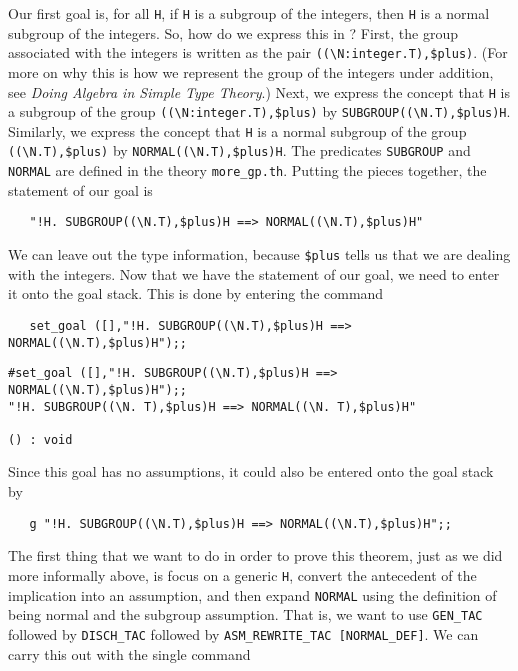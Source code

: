 Our first goal is, for all {\small\tt H}, if {\small\tt H} is a
subgroup of the integers, then {\small\tt H} is a normal subgroup of
the integers.  So, how do we express this in \HOL?  First, the group
associated with the integers is written as the pair
{\small\verb+((\N:integer.T),$plus)+}.  (For more on why this is
how we represent the group of the integers under addition, see
{\it Doing Algebra in Simple Type Theory}.)  Next, we express the
concept that {\small\tt H} is a subgroup of the group
{\small\verb+((\N:integer.T),$plus)+} by
{\small\verb+SUBGROUP((\N.T),$plus)H+}.
Similarly, we express the concept that {\small\tt H} is a normal
subgroup of the group {\small\verb+((\N.T),$plus)+} by
{\small\verb+NORMAL((\N.T),$plus)H+}.  The predicates
{\small\verb+SUBGROUP+} and {\small\verb+NORMAL+} are
defined in the theory {\small\verb+more_gp.th+}.  Putting the
pieces together, the statement of our goal is
\begin{verbatim}
   "!H. SUBGROUP((\N.T),$plus)H ==> NORMAL((\N.T),$plus)H"
\end{verbatim}
We can leave out the type information, because
{\small\verb+$plus+} tells us that we are dealing with the
integers.  Now that we have the statement of our goal, we need to
enter it onto the goal stack.  This is done by entering the command
\begin{verbatim}
   set_goal ([],"!H. SUBGROUP((\N.T),$plus)H ==> NORMAL((\N.T),$plus)H");;
\end{verbatim}
\begin{session}
\begin{verbatim}
#set_goal ([],"!H. SUBGROUP((\N.T),$plus)H ==> NORMAL((\N.T),$plus)H");;
"!H. SUBGROUP((\N. T),$plus)H ==> NORMAL((\N. T),$plus)H"

() : void
\end{verbatim}
\end{session}
Since this goal has no assumptions, it could also be entered onto
the goal stack by
\begin{verbatim}
   g "!H. SUBGROUP((\N.T),$plus)H ==> NORMAL((\N.T),$plus)H";;
\end{verbatim}

The first thing that we want to do in order to prove this theorem,
just as we did more informally above, is focus on a generic {\small\tt H}, 
convert the antecedent of the implication into an assumption, and then
expand {\small\verb+NORMAL+} using the definition of being normal
and the subgroup assumption.  That is, we want to use
{\small\verb+GEN_TAC+} followed by {\small\verb+DISCH_TAC+}
followed by {\small\verb+ASM_REWRITE_TAC [NORMAL_DEF]+}.  We can
carry this out with the single command 

